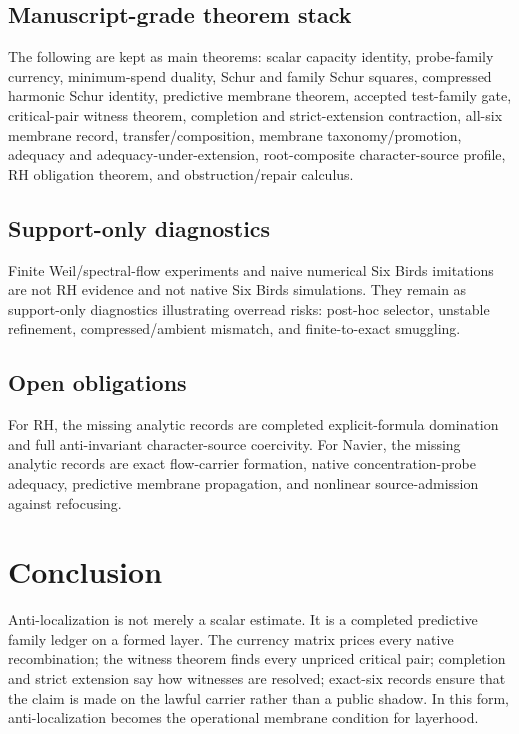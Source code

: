 \documentclass[11pt]{article}
\begin{document}
\subsection{Manuscript-grade theorem stack}
The following are kept as main theorems: scalar capacity identity, probe-family currency, minimum-spend duality, Schur and family Schur squares, compressed harmonic Schur identity, predictive membrane theorem, accepted test-family gate, critical-pair witness theorem, completion and strict-extension contraction, all-six membrane record, transfer/composition, membrane taxonomy/promotion, adequacy and adequacy-under-extension, root-composite character-source profile, RH obligation theorem, and obstruction/repair calculus.

\subsection{Support-only diagnostics}
Finite Weil/spectral-flow experiments and naive numerical Six Birds imitations are not RH evidence and not native Six Birds simulations.  They remain as support-only diagnostics illustrating overread risks: post-hoc selector, unstable refinement, compressed/ambient mismatch, and finite-to-exact smuggling.

\subsection{Open obligations}
For RH, the missing analytic records are completed explicit-formula domination and full anti-invariant character-source coercivity.  For Navier, the missing analytic records are exact flow-carrier formation, native concentration-probe adequacy, predictive membrane propagation, and nonlinear source-admission against refocusing.

\section{Conclusion}
Anti-localization is not merely a scalar estimate.  It is a completed predictive family ledger on a formed layer.  The currency matrix prices every native recombination; the witness theorem finds every unpriced critical pair; completion and strict extension say how witnesses are resolved; exact-six records ensure that the claim is made on the lawful carrier rather than a public shadow.  In this form, anti-localization becomes the operational membrane condition for layerhood.
\end{document}
